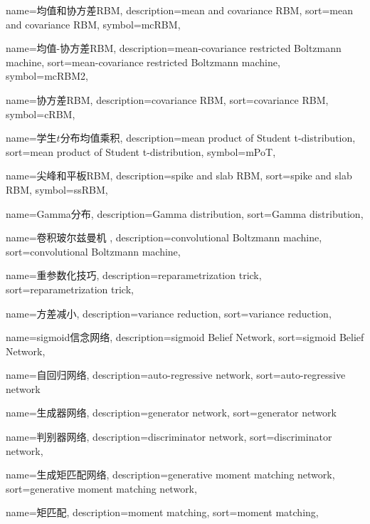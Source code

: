 {
  name=均值和协方差RBM,
  description={mean and covariance RBM},
  sort={mean and covariance RBM},
  symbol={mcRBM},
}

{
  name=均值-协方差RBM,
  description={mean-covariance restricted Boltzmann machine},
  sort={mean-covariance restricted Boltzmann machine},
  symbol={mcRBM2},
}

{
  name=协方差RBM,
  description={covariance RBM},
  sort={covariance RBM},
  symbol={cRBM},
}

{
  name=学生$t$分布均值乘积,
  description={mean product of Student t-distribution},
  sort={mean product of Student t-distribution},
  symbol={mPoT},
}

{
  name=尖峰和平板RBM,
  description={spike and slab RBM},
  sort={spike and slab RBM},
  symbol={ssRBM},
}

{
  name=Gamma分布,
  description={Gamma distribution},
  sort={Gamma distribution},
}

{
  name=卷积玻尔兹曼机 ,
  description={convolutional Boltzmann machine},
  sort={convolutional Boltzmann machine},
}

{
  name=重参数化技巧,
  description={reparametrization trick},
  sort={reparametrization trick},
}

{
  name=方差减小,
  description={variance reduction},
  sort={variance reduction},
}

{
  name=sigmoid信念网络,
  description={sigmoid Belief Network},
  sort={sigmoid Belief Network},
}

{
  name=自回归网络,
  description={auto-regressive network},
  sort={auto-regressive network}
}

{
  name=生成器网络,
  description={generator network},
  sort={generator network}
}

{
  name=判别器网络,
  description={discriminator network},
  sort={discriminator network},
}

{
  name=生成矩匹配网络,
  description={generative moment matching network},
  sort={generative moment matching network},
}

{
  name=矩匹配,
  description={moment matching},
  sort={moment matching},
}

